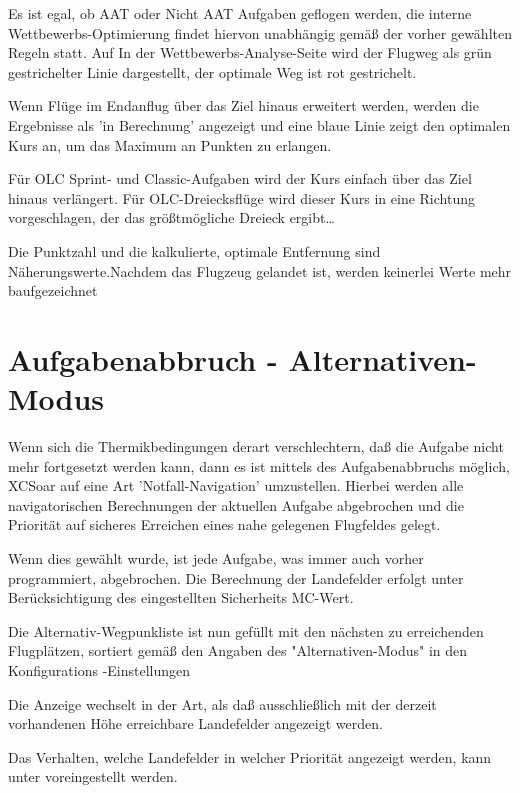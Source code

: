 Es ist egal, ob AAT oder Nicht AAT Aufgaben geflogen werden, die interne Wettbewerbs-Optimierung findet hiervon unabhängig gemäß der vorher gewählten Regeln statt.  Auf In der Wettbewerbs-Analyse-Seite wird der Flugweg als grün gestrichelter Linie dargestellt, der optimale Weg ist rot gestrichelt.

Wenn Flüge im Endanflug über das Ziel hinaus erweitert werden, werden die Ergebnisse als 'in Berechnung' angezeigt und eine blaue Linie zeigt den optimalen Kurs an, um das Maximum an Punkten zu erlangen.

Für OLC Sprint- und Classic-Aufgaben wird der Kurs einfach über das Ziel hinaus verlängert.  Für OLC-Dreiecksflüge wird dieser Kurs in eine Richtung vorgeschlagen, der das größtmögliche Dreieck ergibt\dots

Die Punktzahl und die kalkulierte, optimale Entfernung sind Näherungswerte.Nachdem das Flugzeug gelandet ist, werden keinerlei Werte mehr baufgezeichnet

\section{Aufgabenabbruch - Alternativen-Modus}\label{sec:taskabort}

Wenn sich die Thermikbedingungen derart verschlechtern, daß die Aufgabe nicht mehr fortgesetzt werden kann,
dann es ist mittels des Aufgabenabbruchs möglich, \textsf{XCSoar} auf eine Art 'Notfall-Navigation' umzustellen.
Hierbei werden alle navigatorischen Berechnungen der aktuellen Aufgabe abgebrochen und die Priorität auf sicheres Erreichen eines nahe gelegenen Flugfeldes gelegt.

Wenn dies gewählt wurde,  ist jede Aufgabe, was immer auch vorher programmiert, abgebrochen.
Die Berechnung der Landefelder erfolgt unter Berücksichtigung des eingestellten Sicherheits MC-Wert.

 Die Alternativ-Wegpunkliste ist nun gefüllt mit den nächsten zu erreichenden Flugplätzen, sortiert gemäß den Angaben des  "Alternativen-Modus" in den Konfigurations -Einstellungen

Die Anzeige wechselt in der Art, als daß ausschließlich mit  der derzeit vorhandenen Höhe erreichbare
Landefelder angezeigt werden.

Das Verhalten, welche Landefelder in welcher Priorität angezeigt werden, kann  unter  voreingestellt werden.

